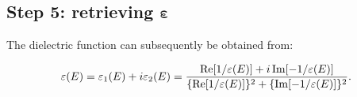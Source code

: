 \documentclass[12pt,a4paper]{article}
\def\frac#1#2{{{#1}\over {#2}}}
\numberwithin{equation}{section}
\numberwithin{figure}{section}
\numberwithin{table}{section}
\begin{document}
\subsection{Step 5: retrieving $\boldsymbol\varepsilon$}
The dielectric function  can subsequently be obtained from:

\begin{equation}
    \varepsilon(E)=\varepsilon_{1}(E)+i \varepsilon_{2}(E)=\frac{\operatorname{Re}[1 / \varepsilon(E)]+i \operatorname{Im}[-1 / \varepsilon(E)]}{\{\operatorname{Re}[1 / \varepsilon(E)]\}^{2}+\{\operatorname{Im}[-1 / \varepsilon(E)]\}^{2}}.
\end{equation}


\vspace{2cm}



\end{document}
